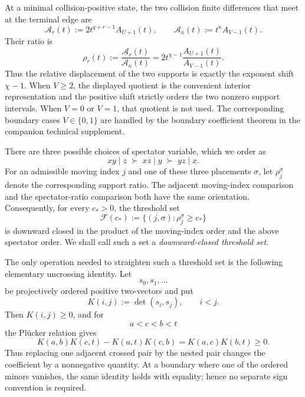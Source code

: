 \documentclass[11pt]{article}
\theoremstyle{definition}
\begin{document}
At a minimal collision-positive state, the two collision finite differences that meet at the terminal edge are
\begin{equation*}
\mathcal A_r(t)
:=2t^{q+r-1}A_{U+1}(t),
\qquad
\mathcal A_\kappa(t)
:=t^\kappa A_{V-1}(t).
\end{equation*}
Their ratio is
\begin{equation*}
\rho_r(t)
:=\frac{\mathcal A_r(t)}{\mathcal A_\kappa(t)}
=2t^{\chi-1}\frac{A_{U+1}(t)}{A_{V-1}(t)}.
\end{equation*}
Thus the relative displacement of the two supports is exactly the exponent shift \(\chi-1\).  When \(V\ge2\), the displayed quotient is the convenient interior representation and the positive shift strictly orders the two nonzero support intervals.  When \(V=0\) or \(V=1\), that quotient is not used.  The corresponding boundary cases \(V\in\{0,1\}\) are handled by the boundary coefficient theorem in the companion technical supplement.

There are three possible choices of spectator variable, which we order as
\begin{equation*}
xy\mid z\;\succ\;xz\mid y\;\succ\;yz\mid x.
\end{equation*}
For an admissible moving index \(j\) and one of these three placements \(\sigma\), let \(\rho_j^\sigma\) denote the corresponding support ratio.  The adjacent moving-index comparison and the spectator-ratio comparison both have the same orientation.  Consequently, for every \(c_*>0\), the threshold set
\begin{equation*}
\mathcal F(c_*)
:=\{(j,\sigma):\rho_j^\sigma\ge c_*\}
\end{equation*}
is downward closed in the product of the moving-index order and the above spectator order.  We shall call such a set a \emph{downward-closed threshold set}.

The only operation needed to straighten such a threshold set is the following elementary uncrossing identity.  Let
\begin{equation*}
s_0,s_1,\ldots
\end{equation*}
be projectively ordered positive two-vectors and put
\begin{equation*}
K(i,j):=\det(s_i,s_j),
\qquad i<j.
\end{equation*}
Then \(K(i,j)\ge0\), and for
\begin{equation*}
a<c<b<t
\end{equation*}
the Pl\"ucker relation gives
\begin{equation*}
K(a,b)K(c,t)-K(a,t)K(c,b)
=K(a,c)K(b,t)\ge0.
\end{equation*}
Thus replacing one adjacent crossed pair by the nested pair changes the coefficient by a nonnegative quantity.  At a boundary where one of the ordered minors vanishes, the same identity holds with equality; hence no separate sign convention is required.
\end{document}
